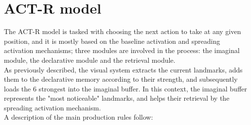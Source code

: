 \documentclass[a4paper,singleside,12pt]{report} %
\begin{document}
    \section{ACT-R model}
	The ACT-R model is tasked with choosing the next action to take at any given position, and it is
	mostly based on the baseline activation and spreading activation mechanisms; three modules are
	involved in the process: the imaginal module, the declarative module and the retrieval module.\\
	As previously described, the visual system extracts the current landmarks, adds them to the
	declarative memory according to their strength, and subsequently loads the 6 strongest into the
	imaginal buffer. In this context, the imaginal buffer represents the "most noticeable"
	landmarks, and helps their retrieval by the spreading activation mechanism.\\
	A description of the main production rules follow:
\end{document}
